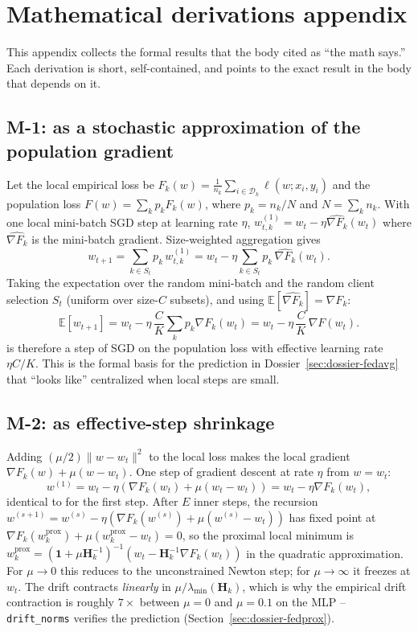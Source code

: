 \section{Mathematical derivations appendix}
\label{sec:math-appendix}

This appendix collects the formal results that the body cited as
``the math says.'' Each derivation is short, self-contained, and
points to the exact result in the body that depends on it.

\subsection{M-1: \fedavg{} as a stochastic approximation of the
population gradient}

Let the local empirical loss be $F_k(w) = \frac{1}{n_k} \sum_{i \in
\mathcal{D}_k} \ell(w; x_i, y_i)$ and the population loss
$F(w) = \sum_k p_k F_k(w)$, where $p_k = n_k / N$ and
$N = \sum_k n_k$. With one local mini-batch SGD step at learning
rate $\eta$,
$w_{t,k}^{(1)} = w_t - \eta \widehat{\nabla F_k}(w_t)$ where
$\widehat{\nabla F_k}$ is the mini-batch gradient. Size-weighted
aggregation gives
\[
w_{t+1} = \sum_{k \in S_t} p_k\, w_{t,k}^{(1)}
= w_t - \eta \sum_{k \in S_t} p_k\, \widehat{\nabla F_k}(w_t).
\]
Taking the expectation over the random mini-batch and the random
client selection $S_t$ (uniform over size-$C$ subsets), and using
$\mathbb{E}[\widehat{\nabla F_k}] = \nabla F_k$:
\[
\mathbb{E}[w_{t+1}] = w_t - \eta \, \frac{C}{K} \sum_k p_k \nabla F_k(w_t)
= w_t - \eta\,\frac{C}{K}\,\nabla F(w_t).
\]
\fedavg{} is therefore a step of SGD on the population loss with
effective learning rate $\eta C/K$. This is the formal basis for
the prediction in Dossier~\ref{sec:dossier-fedavg} that \fedavg{}
``looks like'' centralized when local steps are small.

\subsection{M-2: \fedprox{} as effective-step shrinkage}

Adding $(\mu/2)\|w - w_t\|^2$ to the local loss makes the local
gradient $\nabla F_k(w) + \mu(w - w_t)$. One step of gradient
descent at rate $\eta$ from $w = w_t$:
\[
w^{(1)} = w_t - \eta(\nabla F_k(w_t) + \mu(w_t - w_t)) = w_t - \eta \nabla F_k(w_t),
\]
identical to \fedavg{} for the first step. After $E$ inner steps,
the recursion $w^{(s+1)} = w^{(s)} - \eta(\nabla F_k(w^{(s)}) +
\mu(w^{(s)} - w_t))$ has fixed point at
$\nabla F_k(w_k^{\mathrm{prox}}) + \mu(w_k^{\mathrm{prox}} - w_t) = 0$,
so the proximal local minimum is
$w_k^{\mathrm{prox}} = (\mathbf{1} + \mu \mathbf{H}_k^{-1})^{-1}(w_t -
\mathbf{H}_k^{-1} \nabla F_k(w_t))$ in the quadratic approximation.
For $\mu \!\to\! 0$ this reduces to the unconstrained Newton step;
for $\mu \!\to\! \infty$ it freezes at $w_t$. The drift contracts
\emph{linearly} in $\mu/\lambda_{\min}(\mathbf{H}_k)$, which is why
the empirical drift contraction is roughly $7\!\times$ between
$\mu\!=\!0$ and $\mu\!=\!0.1$ on the MLP -- \texttt{drift\_norms}
verifies the prediction (Section~\ref{sec:dossier-fedprox}).

